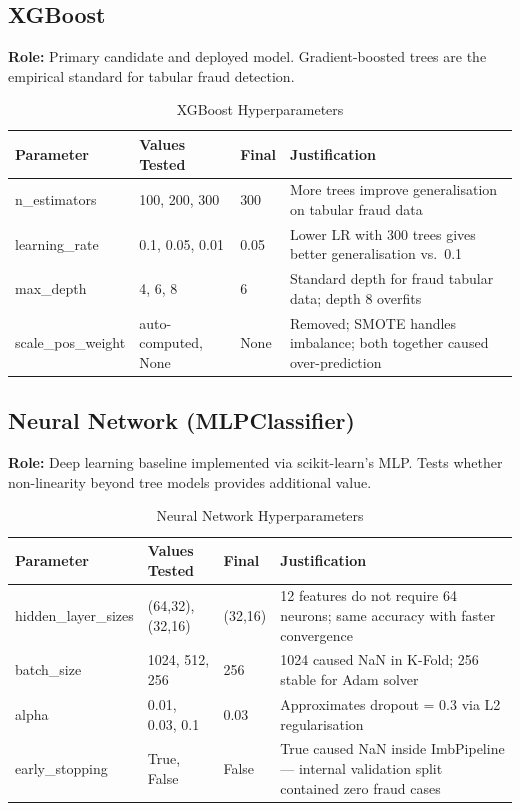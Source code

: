 \documentclass[12pt,a4paper]{article}
\begin{document}
\subsection{XGBoost}

\textbf{Role:} Primary candidate and deployed model. Gradient-boosted trees are the empirical standard for tabular fraud detection.

\begin{table}[H]
\centering
\caption{XGBoost Hyperparameters}
\label{tab:hp_xgb}
\small
\setlength{\tabcolsep}{5pt}
\begin{tabular}{p{2.8cm}p{3.2cm}p{1.8cm}p{6.0cm}}
\toprule
\textbf{Parameter} & \textbf{Values Tested} & \textbf{Final} & \textbf{Justification} \\
\midrule
n\_estimators & 100, 200, 300 & 300 & More trees improve generalisation on tabular fraud data \\
learning\_rate & 0.1, 0.05, 0.01 & 0.05 & Lower LR with 300 trees gives better generalisation vs.\ 0.1 \\
max\_depth & 4, 6, 8 & 6 & Standard depth for fraud tabular data; depth 8 overfits \\
scale\_pos\_weight & auto-computed, None & None & Removed; SMOTE handles imbalance; both together caused over-prediction \\
\bottomrule
\end{tabular}
\end{table}

\subsection{Neural Network (MLPClassifier)}

\textbf{Role:} Deep learning baseline implemented via scikit-learn's MLP. Tests whether non-linearity beyond tree models provides additional value.

\begin{table}[H]
\centering
\caption{Neural Network Hyperparameters}
\label{tab:hp_nn}
\small
\setlength{\tabcolsep}{5pt}
\begin{tabular}{p{2.8cm}p{3.2cm}p{1.8cm}p{6.0cm}}
\toprule
\textbf{Parameter} & \textbf{Values Tested} & \textbf{Final} & \textbf{Justification} \\
\midrule
hidden\_layer\_sizes & (64,32), (32,16) & (32,16) & 12 features do not require 64 neurons; same accuracy with faster convergence \\
batch\_size & 1024, 512, 256 & 256 & 1024 caused NaN in K-Fold; 256 stable for Adam solver \\
alpha & 0.01, 0.03, 0.1 & 0.03 & Approximates dropout = 0.3 via L2 regularisation \\
early\_stopping & True, False & False & True caused NaN inside ImbPipeline --- internal validation split contained zero fraud cases \\
\bottomrule
\end{tabular}
\end{table}
\end{document}
